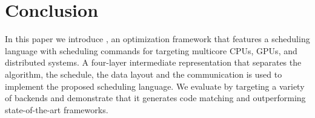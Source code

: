 \vspace{-0.25cm}
\section{Conclusion}

In this paper we introduce \framework, an optimization framework that features a scheduling language with scheduling commands for targeting multicore CPUs, GPUs, and distributed systems.  A four-layer intermediate representation that separates the algorithm, the schedule, the data layout and the communication is used to implement the proposed scheduling language.
We evaluate \framework by targeting a variety of backends and demonstrate that it generates code matching and outperforming state-of-the-art frameworks.

\newpage